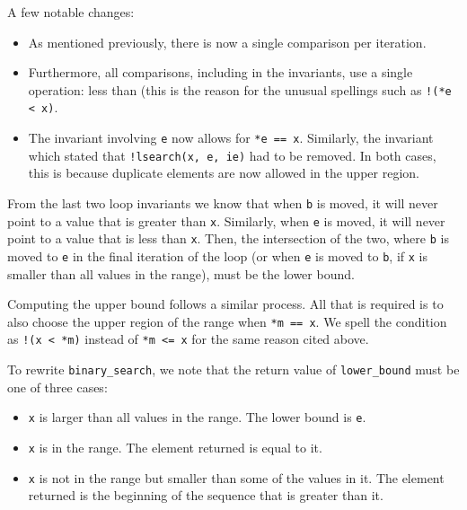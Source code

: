 

A few notable changes:

\begin{itemize}
    \item
        As mentioned previously, there is now a single comparison per iteration.
    \item
        Furthermore, all comparisons, including in the invariants, use a single
        operation: less than (this is the reason for the unusual spellings such
        as \texttt{!(*e < x)}.
    \item
        The invariant involving \texttt{e} now allows for \texttt{*e == x}.
        Similarly, the invariant which stated that \texttt{!lsearch(x, e, ie)}
        had to be removed.  In both cases, this is because duplicate elements
        are now allowed in the upper region.
\end{itemize}

From the last two loop invariants we know that when \texttt{b} is moved, it will
never point to a value that is greater than \texttt{x}.  Similarly, when
\texttt{e} is moved, it will never point to a value that is less than
\texttt{x}.  Then, the intersection of the two, where \texttt{b} is moved to
\texttt{e} in the final iteration of the loop (or when \texttt{e} is moved to
\texttt{b}, if \texttt{x} is smaller than all values in the range), must be the
lower bound.

Computing the upper bound follows a similar process.  All that is required is to
also choose the upper region of the range when \texttt{*m == x}.  We spell
the condition as \texttt{!(x < *m)} instead of \texttt{*m <= x} for the same
reason cited above.



To rewrite \texttt{binary\_search}, we note that the return value of
\texttt{lower\_bound} must be one of three cases:

\begin{itemize}
    \item
        \texttt{x} is larger than all values in the range.  The lower bound is
        \texttt{e}.
    \item \texttt{x} is in the range.  The element returned is equal to it.
    \item
        \texttt{x} is not in the range but smaller than some of the values in
        it.  The element returned is the beginning of the sequence that is
        greater than it.
\end{itemize}

